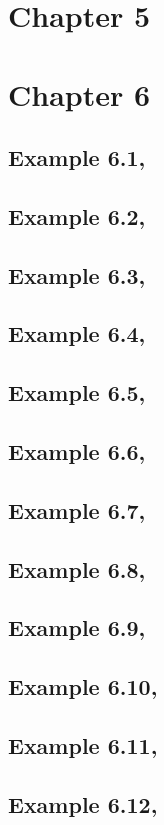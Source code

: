 \documentclass{article}\usepackage[]{graphicx}\usepackage[]{color}
\begin{document}
\section{Chapter 5}



\section{Chapter 6}

\subsection{Example 6.1,}
\subsection{Example 6.2,}
\subsection{Example 6.3,}
\subsection{Example 6.4,}
\subsection{Example 6.5,}
\subsection{Example 6.6,}
\subsection{Example 6.7,}
\subsection{Example 6.8,}
\subsection{Example 6.9,}
\subsection{Example 6.10,}
\subsection{Example 6.11,}
\subsection{Example 6.12,}
\end{document}
